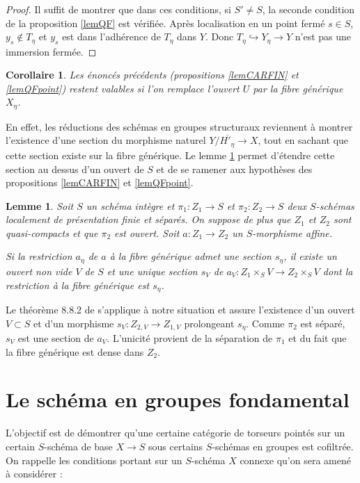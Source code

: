 \documentclass[11pt]{amsart}
\numberwithin{equation}{section}
\newtheorem{lem}[thm]{Lemme}
\newtheorem{cor}[thm]{Corollaire}
\theoremstyle{definition}
\theoremstyle{remark}
\begin{document}
\begin{proof} Il suffit de montrer que dans ces conditions, si $S' \not=S$, la seconde condition de la proposition \ref{lemQF} est v\'erifi\'ee. Apr\`es localisation en un point ferm\'e $s \in S$, $y_s\notin T_{\eta} $ et $y_s$ est dans l'adh\'erence de $T_\eta $ dans $Y$. Donc $T_\eta \hookrightarrow Y_{\eta}\to  Y$ n'est pas une immersion ferm\'ee. \end{proof}


\begin{cor}\label{generique} Les \'enonc\'es pr\'ec\'edents (propositions \ref{lemCARFIN} et \ref{lemQFpoint}) restent valables si l'on remplace l'ouvert $U$ par la fibre g\'en\'erique $X_\eta $.
\end{cor}
\proof
En effet, les r\'eductions des sch\'emas en groupes structuraux reviennent \`a montrer l'existence d'une section du morphisme naturel $Y/\overline{H'_\eta}\to X$, tout en sachant que cette section existe sur la fibre g\'en\'erique. Le lemme \ref{appendice} permet d'\'etendre cette section au dessus d'un ouvert de $S$ et de se ramener aux hypoth\`eses des propositions \ref{lemCARFIN} et \ref{lemQFpoint}.
\endproof

\begin{lem}\label{appendice} Soit $S$ un sch\'ema int\`egre et $\pi _1 : Z_1\to S$ et $\pi _2 : Z_2 \to S$ deux $S$-sch\'emas localement de pr\'esentation finie et s\'epar\'es. On suppose de plus que $Z_1$ et $Z_2$ sont quasi-compacts et que $\pi _2$ est ouvert. Soit $a: Z_1 \to Z_2$ un $S$-morphisme affine.

Si la restriction $a_\eta $ de $a$ \`a la fibre g\'en\'erique admet une section $s_\eta $, il existe un ouvert non vide $V$ de $S$ et une unique section $s_V$ de $a_V : Z_1 \times _S V \to Z_2 \times _S V$ dont la restriction \`a la fibre g\'en\'erique est $s_\eta $.
\end{lem}
\proof Le th\'eor\`eme 8.8.2 de \cite{EGAIV-3} s'applique \`a notre situation et assure l'existence d'un ouvert $V\subset S$ et d'un morphisme $s_V : Z_{2,V} \to Z_{1,V}$ prolongeant $s_\eta $. Comme $\pi _2$ est s\'epar\'e, $s_V$ est une section de $a_V$. L'unicit\'e provient de la s\'eparation de $\pi _1$ et du fait que la fibre g\'en\'erique est dense dans $Z_2$.
\endproof




\section{Le sch\'ema en groupes fondamental}\label{fondamental}
\label{sezSGF}
 L'objectif est de d\'emontrer qu'une certaine cat\'egorie de torseurs point\'es sur un certain $S$-sch\'ema de base $X\to S$ sous certains $S$-sch\'emas en groupes est cofiltr\'ee. On rappelle les conditions portant sur un $S$-sch\'ema $X$ connexe qu'on sera amen\'e \`a consid\'erer :
 \smallskip
\end{document}
